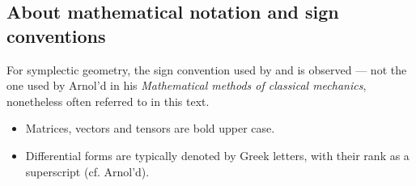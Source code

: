 \subsection*{About mathematical notation and sign conventions}
For symplectic geometry, the sign convention used by \citet{Abraham1978} and \citet{Cannas2001} is observed --- not the one used by Arnol'd in his \emph{Mathematical methods of classical mechanics}, nonetheless often referred to in this text.

\begin{itemize}
    \item Matrices, vectors and tensors are bold upper case.
    \item Differential forms are typically denoted by Greek letters, with their rank as a superscript (cf. Arnol'd). 
\end{itemize}
